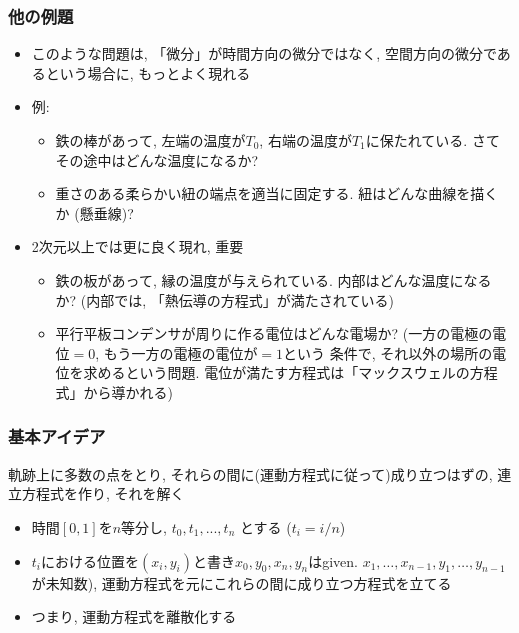 \documentclass[12pt,dvipdfmx]{beamer}
\begin{document}
\begin{frame}
  \frametitle{他の例題}
  \begin{itemize}
  \item このような問題は, 「微分」が時間方向の微分ではなく,
    空間方向の微分であるという場合に, もっとよく現れる
  \item 例:
    \begin{itemize}
    \item 鉄の棒があって, 左端の温度が$T_0$,
      右端の温度が$T_1$に保たれている. さてその途中はどんな温度になるか?
    \item 重さのある柔らかい紐の端点を適当に固定する.
      紐はどんな曲線を描くか (懸垂線)?
    \end{itemize}

  \item 2次元以上では更に良く現れ, 重要
    \begin{itemize}
    \item 鉄の板があって, 縁の温度が与えられている.
      内部はどんな温度になるか?
      (内部では, 「熱伝導の方程式」が満たされている)
    \item 平行平板コンデンサが周りに作る電位はどんな電場か?
      (一方の電極の電位$=0$, もう一方の電極の電位が$=1$という
      条件で, それ以外の場所の電位を求めるという問題.
      電位が満たす方程式は「マックスウェルの方程式」から導かれる)
    \end{itemize}
  \end{itemize}
\end{frame}

\begin{frame}
  \frametitle{基本アイデア}

  軌跡上に多数の点をとり,
  それらの間に(運動方程式に従って)成り立つはずの,
  連立方程式を作り, それを解く
  
  \begin{itemize}
  \item 時間$[0,1]$を$n$等分し, $t_0, t_1, ..., t_n$ とする ($t_i = i/n$)
  \item $t_i$における位置を$(x_i, y_i)$と書き$x_0, y_0, x_n, y_n$はgiven.
    $x_1, \ldots , x_{n-1}, y_1, \ldots , y_{n-1}$が未知数),
    運動方程式を元にこれらの間に成り立つ方程式を立てる
    
  \item つまり, 運動方程式を離散化する
  \end{itemize}
\end{frame}
\end{document}
